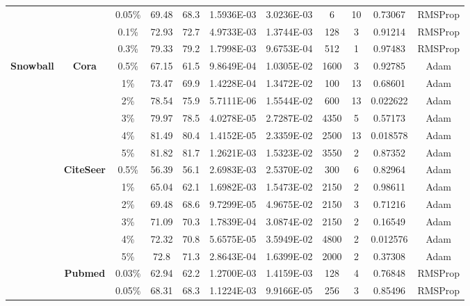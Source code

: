\begin{table}[htbp]
\begin{tabular}{ccccc|cccccc}
          &       & 0.05\% & 69.48 & 68.3  & 1.5936E-03 & 3.0236E-03 & 6     & 10    & 0.73067 & RMSProp \\
          &       & 0.1\% & 72.93 & 72.7  & 4.9733E-03 & 1.3744E-03 & 128   & 3     & 0.91214 & RMSProp \\
          &       & 0.3\% & 79.33 & 79.2  & 1.7998E-03 & 9.6753E-04 & 512   & 1     & 0.97483 & RMSProp \\
    \midrule
    \multirow{16}[2]{*}{\textbf{Snowball}} & \multirow{6}[1]{*}{\textbf{Cora}} & 0.5\% & 67.15 & 61.5  & 9.8649E-04 & 1.0305E-02 & 1600  & 3     & 0.92785 & Adam \\
          &       & 1\%   & 73.47 & 69.9  & 1.4228E-04 & 1.3472E-02 & 100   & 13    & 0.68601 & Adam \\
          &       & 2\%   & 78.54 & 75.9  & 5.7111E-06 & 1.5544E-02 & 600   & 13    & 0.022622 & Adam \\
          &       & 3\%   & 79.97 & 78.5  & 4.0278E-05 & 2.7287E-02 & 4350  & 5     & 0.57173 & Adam \\
          &       & 4\%   & 81.49 & 80.4  & 1.4152E-05 & 2.3359E-02 & 2500  & 13    & 0.018578 & Adam \\
          &       & 5\%   & 81.82 & 81.7  & 1.2621E-03 & 1.5323E-02 & 3550  & 2     & 0.87352 & Adam \\
          & \multirow{6}[0]{*}{\textbf{CiteSeer}} & 0.5\% & 56.39 & 56.1  & 2.6983E-03 & 2.5370E-02 & 300   & 6     & 0.82964 & Adam \\
          &       & 1\%   & 65.04 & 62.1  & 1.6982E-03 & 1.5473E-02 & 2150  & 2     & 0.98611 & Adam \\
          &       & 2\%   & 69.48 & 68.6  & 9.7299E-05 & 4.9675E-02 & 2150  & 3     & 0.71216 & Adam \\
          &       & 3\%   & 71.09 & 70.3  & 1.7839E-04 & 3.0874E-02 & 2150  & 2     & 0.16549 & Adam \\
          &       & 4\%   & 72.32 & 70.8  & 5.6575E-05 & 3.5949E-02 & 4800  & 2     & 0.012576 & Adam \\
          &       & 5\%   & 72.8  & 71.3  & 2.8643E-04 & 1.6399E-02 & 2000  & 2     & 0.37308 & Adam \\
          & \multirow{4}[1]{*}{\textbf{Pubmed}} & 0.03\% & 62.94 & 62.2  & 1.2700E-03 & 1.4159E-03 & 128   & 4     & 0.76848 & RMSProp \\
          &       & 0.05\% & 68.31 & 68.3  & 1.1224E-03 & 9.9166E-05 & 256   & 3     & 0.85496 & RMSProp \\

\end{tabular}
\end{table}

